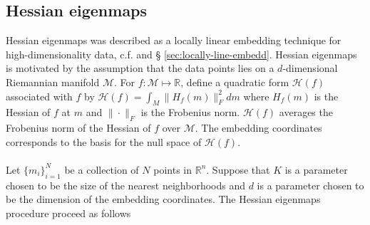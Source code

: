 \subsection{Hessian eigenmaps}
\label{sec:hessian-eigenmaps}
Hessian eigenmaps \citep{donoho03:_hesian} was described as a locally
linear embedding technique for high-dimensionality data,
c.f. \citep{roweis00:_nonlin} and \S
\ref{sec:locally-line-embedd}. Hessian eigenmaps is motivated by the
assumption that the data points lies on a $d$-dimensional Riemannian
manifold $\mathcal{M}$. For $f \colon \mathcal{M} \mapsto \mathbb{R}$,
define a quadratic form $\mathcal{H}(f)$ associated with $f$ by
$\mathcal{H}(f) = \int_{M}{ \| H_f(m) \|_{F}^{2} dm }$ where $H_f(m)$
is the Hessian of $f$ at $m$ and $\| \cdot \|_F$ is the Frobenius
norm. $\mathcal{H}(f)$ averages the Frobenius norm of the Hessian of
$f$ over $\mathcal{M}$. The embedding coordinates
corresponds to the basis for the null space of $\mathcal{H}(f)$. \\ \\
\noindent
Let $\{m_i\}_{i=1}^{N}$ be a collection of $N$ points in
$\mathbb{R}^{n}$. Suppose that $K$ is a parameter chosen to be the
size of the nearest neighborhoods and $d$ is a parameter chosen to be
the dimension of the embedding coordinates. The Hessian eigenmaps
procedure proceed as follows \citet{donoho03:_hesian}
